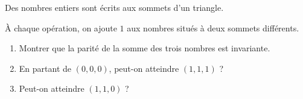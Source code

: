 Des nombres entiers sont écrits aux sommets d'un triangle.

À chaque opération, on ajoute $1$ aux nombres situés à deux sommets
différents.
\begin{enumerate}
  \item Montrer que la parité de la somme des trois nombres est invariante.
  \item En partant de $(0, 0, 0)$, peut-on atteindre $(1, 1, 1)$ ?
  \item Peut-on atteindre $(1, 1, 0)$ ?
\end{enumerate}
